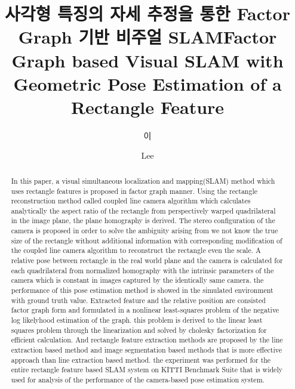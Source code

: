 \documentclass[master,korean,final]{cbnu-ecs}
\title[korean]{사각형 특징의 자세 추정을 통한 Factor Graph 기반 비주얼 SLAM}
\title[english]{Factor Graph based Visual SLAM with Geometric Pose Estimation of a Rectangle Feature}
\author[korean] {이}{재 민}
\author[english]{Lee}{Jae-Min}
\begin{document}
\tableofcontents
\listoffigures
\listoftables
\begin{abstract}
In this paper, a visual simultaneous localization and mapping(SLAM) method which uses rectangle features is proposed in factor graph manner.
Using the rectangle reconstruction method called coupled line camera algorithm which calculates analytically the aspect ratio of the rectangle from perspectively warped quadrilateral in the image plane, the plane homography is derived. The stereo configuration of the camera is proposed in order to solve the ambiguity arising from we not know the true size of the rectangle without additional information with corresponding modification of the coupled line camera algorithm to reconstruct the rectangle even the scale. A relative pose between rectangle in the real world plane and the camera is calculated for each quadrilateral from normalized homography with the intrinsic parameters of the camera which is constant in images captured by the identically same camera. the performance of this pose estimation method is showed in the simulated environment with ground truth value. 
Extracted feature and the relative position are consisted factor graph form and formulated in a nonlinear least-squares problem of the negative log likelyhood estimation of the graph. this problem is derived to the linear least squares problem through the linearization and solved by cholesky factorization for efficient calculation. And rectangle feature extraction methods are proposed by the line extraction based method and image segmentation based methods that is more effective approach than line extraction based method. the experiment was performed for the entire rectangle feature based SLAM system on KITTI Benchmark Suite that is widely used for analysis of the performance of the camera-based pose estimation system.


\end{abstract}
\end{document}
